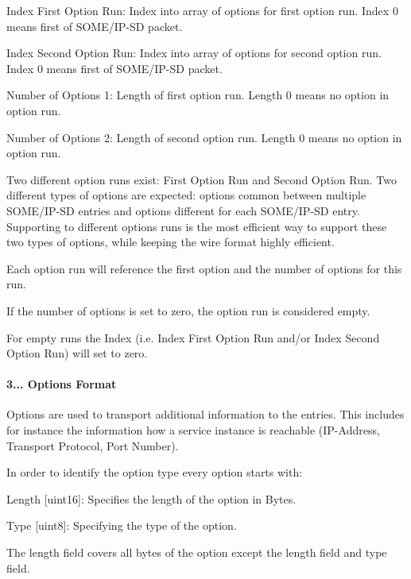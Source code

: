 \begin{DoxyItemize}
\item Index First Option Run\+: Index into array of options for first option run. Index 0 means first of S\+O\+M\+E/\+I\+P-\/\+SD packet.
\item Index Second Option Run\+: Index into array of options for second option run. Index 0 means first of S\+O\+M\+E/\+I\+P-\/\+SD packet.
\item Number of Options 1\+: Length of first option run. Length 0 means no option in option run.
\item Number of Options 2\+: Length of second option run. Length 0 means no option in option run.
\item Two different option runs exist\+: First Option Run and Second Option Run. Two different types of options are expected\+: options common between multiple S\+O\+M\+E/\+I\+P-\/\+SD entries and options different for each S\+O\+M\+E/\+I\+P-\/\+SD entry. Supporting to different options runs is the most efficient way to support these two types of options, while keeping the wire format highly efficient.
\item Each option run will reference the first option and the number of options for this run.
\item If the number of options is set to zero, the option run is considered empty.
\item For empty runs the Index (i.\+e. Index First Option Run and/or Index Second Option Run) will set to zero.
\end{DoxyItemize}

\paragraph*{3... Options Format}


\begin{DoxyItemize}
\item Options are used to transport additional information to the entries. This includes for instance the information how a service instance is reachable (I\+P-\/\+Address, Transport Protocol, Port Number).
\item In order to identify the option type every option starts with\+:
\begin{DoxyItemize}
\item Length \mbox{[}uint16\mbox{]}\+: Specifies the length of the option in Bytes.
\item Type \mbox{[}uint8\mbox{]}\+: Specifying the type of the option.
\end{DoxyItemize}
\item The length field covers all bytes of the option except the length field and type field.
\end{DoxyItemize}

